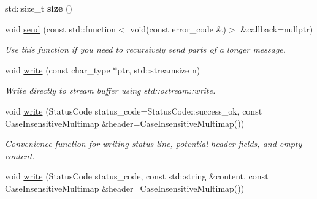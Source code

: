 \begin{DoxyCompactItemize}
\item 
std\+::size\+\_\+t {\bfseries size} ()\hypertarget{classSimpleWeb_1_1ServerBase_1_1Response_a59077fdc6aa32e6539646a1e710ddd32}{}\label{classSimpleWeb_1_1ServerBase_1_1Response_a59077fdc6aa32e6539646a1e710ddd32}

\item 
void \hyperlink{classSimpleWeb_1_1ServerBase_1_1Response_ae57c15847f6d868c03b3594b4dcf69d1}{send} (const std\+::function$<$ void(const error\+\_\+code \&)$>$ \&callback=nullptr)\hypertarget{classSimpleWeb_1_1ServerBase_1_1Response_ae57c15847f6d868c03b3594b4dcf69d1}{}\label{classSimpleWeb_1_1ServerBase_1_1Response_ae57c15847f6d868c03b3594b4dcf69d1}

\begin{DoxyCompactList}\small\item\em Use this function if you need to recursively send parts of a longer message. \end{DoxyCompactList}\item 
void \hyperlink{classSimpleWeb_1_1ServerBase_1_1Response_af08a09fa9e147009e4e6401f648a8234}{write} (const char\+\_\+type $\ast$ptr, std\+::streamsize n)\hypertarget{classSimpleWeb_1_1ServerBase_1_1Response_af08a09fa9e147009e4e6401f648a8234}{}\label{classSimpleWeb_1_1ServerBase_1_1Response_af08a09fa9e147009e4e6401f648a8234}

\begin{DoxyCompactList}\small\item\em Write directly to stream buffer using std\+::ostream\+::write. \end{DoxyCompactList}\item 
void \hyperlink{classSimpleWeb_1_1ServerBase_1_1Response_a60bde9142236954b363ac09af52b3f3e}{write} (Status\+Code status\+\_\+code=Status\+Code\+::success\+\_\+ok, const Case\+Insensitive\+Multimap \&header=Case\+Insensitive\+Multimap())\hypertarget{classSimpleWeb_1_1ServerBase_1_1Response_a60bde9142236954b363ac09af52b3f3e}{}\label{classSimpleWeb_1_1ServerBase_1_1Response_a60bde9142236954b363ac09af52b3f3e}

\begin{DoxyCompactList}\small\item\em Convenience function for writing status line, potential header fields, and empty content. \end{DoxyCompactList}\item 
void \hyperlink{classSimpleWeb_1_1ServerBase_1_1Response_a65278ffe2f4a75c068db5a9fe453478a}{write} (Status\+Code status\+\_\+code, const std\+::string \&content, const Case\+Insensitive\+Multimap \&header=Case\+Insensitive\+Multimap())\hypertarget{classSimpleWeb_1_1ServerBase_1_1Response_a65278ffe2f4a75c068db5a9fe453478a}{}\label{classSimpleWeb_1_1ServerBase_1_1Response_a65278ffe2f4a75c068db5a9fe453478a}


\end{DoxyCompactItemize}
